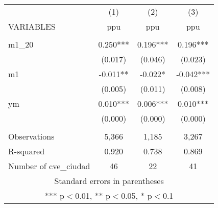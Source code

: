 \begin{tabular}{lccc} \hline
 & (1) & (2) & (3) \\
VARIABLES & ppu & ppu & ppu \\ \hline
 &  &  &  \\
m1\_20 & 0.250*** & 0.196*** & 0.196*** \\
 & (0.017) & (0.046) & (0.023) \\
m1 & -0.011** & -0.022* & -0.042*** \\
 & (0.005) & (0.011) & (0.008) \\
ym & 0.010*** & 0.006*** & 0.010*** \\
 & (0.000) & (0.000) & (0.000) \\
 &  &  &  \\
Observations & 5,366 & 1,185 & 3,267 \\
R-squared & 0.920 & 0.738 & 0.869 \\
 Number of cve\_ciudad & 46 & 22 & 41 \\ \hline
\multicolumn{4}{c}{ Standard errors in parentheses} \\
\multicolumn{4}{c}{ *** p$<$0.01, ** p$<$0.05, * p$<$0.1} \\
\end{tabular}
